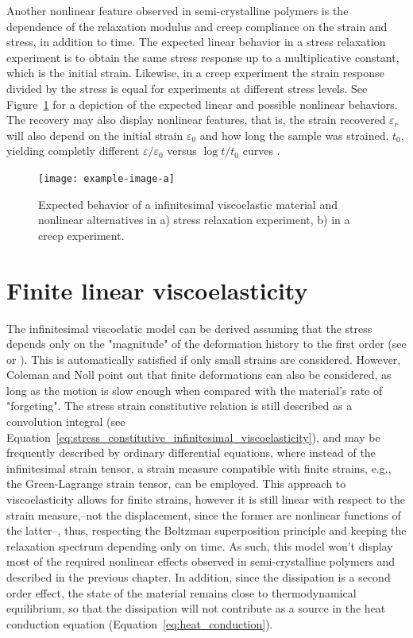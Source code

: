 Another nonlinear feature observed in semi-crystalline polymers is the dependence of the relaxation modulus and creep compliance on the strain and stress, in addition to time.
The expected linear behavior in a stress relaxation experiment is to obtain the same stress response up to a multiplicative constant, which is the initial strain.
Likewise, in a creep experiment the strain response divided by the stress is equal for experiments at different stress levels.
See Figure~\ref{fig:relax_creep_expected} for a depiction of the expected linear and possible nonlinear behaviors.
The recovery may also display nonlinear features, that is, the strain recovered $\varepsilon_r$ will also depend on the initial strain $\varepsilon_0$ and how long the sample was strained, $t_0$, yielding completly different $\varepsilon/\varepsilon_0$ versus $\log t/t_0$ curves \citep{ferryViscoelasticPropertiesPolymers1980}.
\begin{figure}
  \texttt{[image: example-image-a]}
  \caption{Expected behavior of a infinitesimal viscoelastic material and nonlinear alternatives in a) stress relaxation experiment, b) in a creep experiment. }
\label{fig:relax_creep_expected}
\end{figure}


\section{Finite linear viscoelasticity}
The infinitesimal viscoelatic model can be derived assuming that the stress depends only on the "magnitude" of the deformation history to the first order (see \cite{colemanFoundationsLinearViscoelasticity1961} or \cite{christensen2013theory}).
This is automatically satisfied if only small strains are considered.
However, Coleman and Noll \citep{colemanFoundationsLinearViscoelasticity1961} point out that finite deformations can also be considered, as long as the motion is slow enough when compared with the material's rate of "forgeting".
The stress strain constitutive relation is still described as a convolution integral (see Equation~\eqref{eq:stress_constitutive_infinitesimal_viscoelasticity}), and may be frequently described by ordinary differential equations, where instead of the infinitesimal strain tensor, a strain measure compatible with finite strains, e.g., the Green-Lagrange strain tensor, can be employed.
This approach to viscoelasticity allows for finite strains, however it is still linear with respect to the strain measure,--not the displacement, since the former are nonlinear functions of the latter--, thus, respecting the Boltzman superposition principle and keeping the relaxation spectrum depending only on time.
As such, this model won't display most of the required nonlinear effects observed in semi-crystalline polymers and described in the previous chapter.
In addition, since the dissipation is a second order effect, the state of the material remains close to thermodynamical equilibrium, so that the dissipation will not contribute as a source in the heat conduction equation (Equation~\eqref{eq:heat_conduction}).

